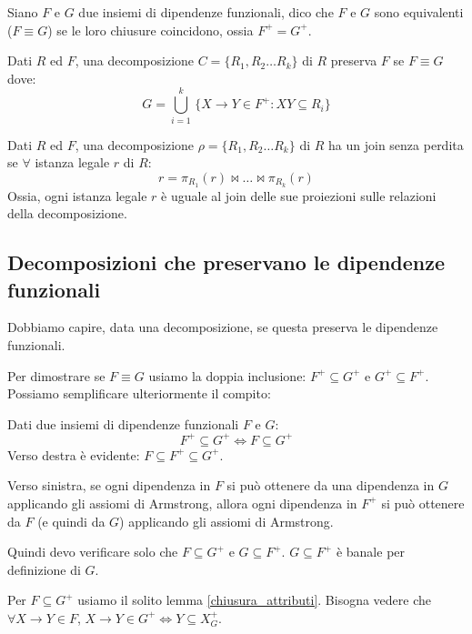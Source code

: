 \begin{defn}
Siano $F$ e $G$ due insiemi di dipendenze funzionali, dico che $F$ e $G$ sono equivalenti ($F \equiv G$) se le loro chiusure coincidono, ossia $F^+ = G^+$.
\end{defn}

\begin{defn}
\label{definizione_insieme_G}
Dati $R$ ed $F$, una decomposizione $C = \{ R_1, R_2 \dots R_k\}$ di $R$ preserva $F$ se $F \equiv G$ dove:
\[
G = \bigcup_{i = 1}^{k} \, \{ X \to Y \in F^+ : XY \subseteq R_i \}
\]
\end{defn}

\begin{defn}
Dati $R$ ed $F$, una decomposizione $\rho = \{ R_1, R_2 \dots R_k \}$ di $R$ ha un join senza perdita se $\forall $ istanza legale $r$ di $R$:
\[
r = \pi_{R_1}(r) \Join \dots \Join \pi_{R_k}(r)
\]
Ossia, ogni istanza legale $r$ \`e uguale al join delle sue proiezioni sulle relazioni della decomposizione.
\end{defn}

\subsection{Decomposizioni che preservano le dipendenze funzionali}

Dobbiamo capire, data una decomposizione, se questa preserva le dipendenze funzionali.

Per dimostrare se $F \equiv G$ usiamo la doppia inclusione: $F^+ \subseteq G^+$ e $G^+ \subseteq F^+$. Possiamo semplificare ulteriormente il compito:
\begin{lem}
Dati due insiemi di dipendenze funzionali $F$ e $G$:
\[
F^+ \subseteq G^+ \iff F \subseteq G^+
\]
Verso destra \`e evidente: $F \subseteq F^+ \subseteq G^+$.

Verso sinistra, se ogni dipendenza in $F$ si pu\`o ottenere da una dipendenza in $G$ applicando gli assiomi di Armstrong, allora ogni dipendenza in $F^+$ si pu\`o ottenere da $F$ (e quindi da $G$) applicando gli assiomi di Armstrong.
\end{lem}
Quindi devo verificare solo che $F \subseteq G^+$ e $G \subseteq F^+$. $G \subseteq F^+$ \`e banale per definizione di $G$.

Per $F \subseteq G^+$ usiamo il solito lemma \ref{chiusura_attributi}. Bisogna vedere che $\forall X \to Y \in F$, $X \to Y \in G^+ \iff Y \subseteq X_{G}^{+}$.

